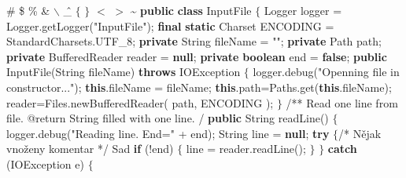 \bigbreak
\codetexNewline \typoscale[800/10]
 \# \$ \% \& $\backslash$ \^ \_ $\{$ $\}$  $<$ $>$ \~\codetexNewline
{} {\bf {\localcolor \Blue public}} {\bf {\localcolor \Blue class}} InputFile $\{$\codetexNewline
{} Logger logger = Logger.getLogger({\localcolor \Yellow "InputFile"});\codetexNewline
{} {\bf {\localcolor \Blue final}} {\bf {\localcolor \Blue static}} Charset ENCODING = StandardCharsets.UTF\_8;\codetexNewline
{} \codetexNewline
{} {\bf {\localcolor \Blue private}} String fileName = {\localcolor \Yellow ""};\codetexNewline
{} {\bf {\localcolor \Blue private}} Path path;\codetexNewline
{} {\bf {\localcolor \Blue private}} BufferedReader reader = {\bf {\localcolor \Blue null}};\codetexNewline
{} {\bf {\localcolor \Blue private}} {\bf {\localcolor \Blue boolean}} end = {\bf {\localcolor \Blue false}};\codetexNewline
{} \codetexNewline
{} {\bf {\localcolor \Blue public}} InputFile(String fileName) {\bf {\localcolor \Blue throws}} IOException $\{$\codetexNewline
{} logger.debug({\localcolor \Yellow "Openning file in constructor..."});\codetexNewline
{} {\bf {\localcolor \Blue this}}.fileName = fileName;\codetexNewline
{} {\bf {\localcolor \Blue this}}.path=Paths.get({\bf {\localcolor \Blue this}}.fileName);\codetexNewline
{} reader=Files.newBufferedReader( path, ENCODING );\codetexNewline
{} $\}$\codetexNewline
{} \codetexNewline
{} {\localcolor \Grey /**}\codetexNewline
{} {\localcolor \Grey * Read one line from file.}\codetexNewline
{} {\localcolor \Grey *}\codetexNewline
{} {\localcolor \Grey * @return String filled with one line.}\codetexNewline
{} {\localcolor \Grey */}\codetexNewline
{} {\bf {\localcolor \Blue public}} String readLine() $\{$\codetexNewline
{} logger.debug({\localcolor \Yellow "Reading line. End="} + end);\codetexNewline
{} String line = {\bf {\localcolor \Blue null}};\codetexNewline
{} \codetexNewline
{} {\bf {\localcolor \Blue try}} $\{${\localcolor \Grey /* Nějak vnoženy}\codetexNewline
{} {\localcolor \Grey komentar */} Sad\codetexNewline
{} {\bf {\localcolor \Blue if}} (!end) $\{$\codetexNewline
{} line = reader.readLine();\codetexNewline
{} $\}$\codetexNewline
{} $\}$ {\bf {\localcolor \Blue catch}} (IOException e) $\{$\codetexNewline

